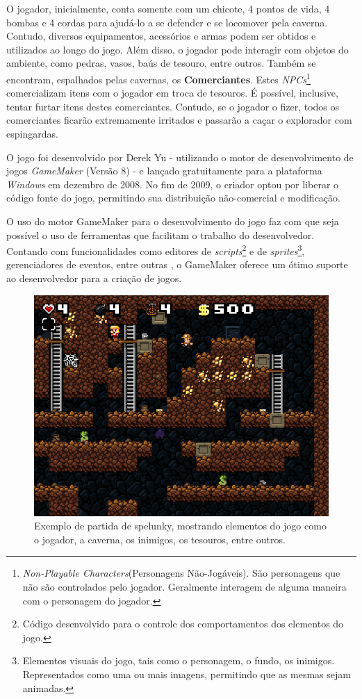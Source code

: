 O jogador, inicialmente, conta somente com um chicote, 4 pontos de vida, 4
bombas e 4 cordas para ajudá-lo a se defender e se locomover pela caverna.
Contudo, diversos equipamentos, acessórios e armas podem ser obtidos e
utilizados ao longo do jogo. Além disso, o jogador pode interagir com objetos do
ambiente, como pedras, vasos, baús de tesouro, entre outros. Também se
encontram, espalhados pelas cavernas, os \textbf{Comerciantes}. Estes
\textit{NPCs}\footnote{\textit{Non-Playable Characters}(Personagens
Não-Jogáveis). São personagens que não são controlados pelo jogador. Geralmente
interagem de alguma maneira com o personagem do jogador.} comercializam itens
com o jogador em troca de tesouros. É possível, inclusive, tentar furtar itens
destes comerciantes. Contudo, se o jogador o fizer, todos os comerciantes
ficarão extremamente irritados e passarão a caçar o explorador com espingardas.

O jogo foi desenvolvido por Derek Yu - utilizando o motor de desenvolvimento de
jogos \textit{GameMaker} (Versão 8) - e lançado gratuitamente para a plataforma
\textit{Windows} em dezembro de 2008\cite{SPELUNKYRELEASE}. No fim de 2009, o
criador optou por liberar o código fonte do jogo, permitindo sua distribuição
não-comercial e modificação\cite{SPELUNKYLICENSE}.

O uso do motor GameMaker para o desenvolvimento do jogo faz com que seja
possível o uso de ferramentas que facilitam o trabalho do desenvolvedor.
Contando com funcionalidades como editores de \textit{scripts}\footnote{Código
desenvolvido para o controle dos comportamentos dos elementos do jogo.} e de
\textit{sprites}\footnote{Elementos visuais do jogo, tais como o personagem, o
fundo, os inimigos. Representados como uma ou mais imagens, permitindo que as
mesmas sejam animadas.}, gerenciadores de eventos, entre outras
\cite{GMAKER8DOCS}, o GameMaker oferece um ótimo suporte ao desenvolvedor para a
criação de jogos.

\begin{figure}[htb!]
\centering\includegraphics[width=.65\textwidth]{fig/spelunky-pc-screen.png}
\caption {\label{fig:spelunky-gameplay}Exemplo de partida de spelunky, mostrando
elementos do jogo como o jogador, a caverna, os inimigos, os tesouros, entre
outros.} \end{figure}

